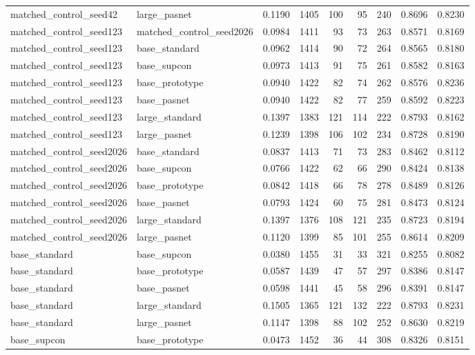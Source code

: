 \begin{tabular}{llrrrrrrr}
matched\_control\_seed42 & large\_pasnet & 0.1190 & 1405 & 100 & 95 & 240 & 0.8696 & 0.8230 \\
matched\_control\_seed123 & matched\_control\_seed2026 & 0.0984 & 1411 & 93 & 73 & 263 & 0.8571 & 0.8169 \\
matched\_control\_seed123 & base\_standard & 0.0962 & 1414 & 90 & 72 & 264 & 0.8565 & 0.8180 \\
matched\_control\_seed123 & base\_supcon & 0.0973 & 1413 & 91 & 75 & 261 & 0.8582 & 0.8163 \\
matched\_control\_seed123 & base\_prototype & 0.0940 & 1422 & 82 & 74 & 262 & 0.8576 & 0.8236 \\
matched\_control\_seed123 & base\_pasnet & 0.0940 & 1422 & 82 & 77 & 259 & 0.8592 & 0.8223 \\
matched\_control\_seed123 & large\_standard & 0.1397 & 1383 & 121 & 114 & 222 & 0.8793 & 0.8162 \\
matched\_control\_seed123 & large\_pasnet & 0.1239 & 1398 & 106 & 102 & 234 & 0.8728 & 0.8190 \\
matched\_control\_seed2026 & base\_standard & 0.0837 & 1413 & 71 & 73 & 283 & 0.8462 & 0.8112 \\
matched\_control\_seed2026 & base\_supcon & 0.0766 & 1422 & 62 & 66 & 290 & 0.8424 & 0.8138 \\
matched\_control\_seed2026 & base\_prototype & 0.0842 & 1418 & 66 & 78 & 278 & 0.8489 & 0.8126 \\
matched\_control\_seed2026 & base\_pasnet & 0.0793 & 1424 & 60 & 75 & 281 & 0.8473 & 0.8124 \\
matched\_control\_seed2026 & large\_standard & 0.1397 & 1376 & 108 & 121 & 235 & 0.8723 & 0.8194 \\
matched\_control\_seed2026 & large\_pasnet & 0.1120 & 1399 & 85 & 101 & 255 & 0.8614 & 0.8209 \\
base\_standard & base\_supcon & 0.0380 & 1455 & 31 & 33 & 321 & 0.8255 & 0.8082 \\
base\_standard & base\_prototype & 0.0587 & 1439 & 47 & 57 & 297 & 0.8386 & 0.8147 \\
base\_standard & base\_pasnet & 0.0598 & 1441 & 45 & 58 & 296 & 0.8391 & 0.8147 \\
base\_standard & large\_standard & 0.1505 & 1365 & 121 & 132 & 222 & 0.8793 & 0.8231 \\
base\_standard & large\_pasnet & 0.1147 & 1398 & 88 & 102 & 252 & 0.8630 & 0.8219 \\
base\_supcon & base\_prototype & 0.0473 & 1452 & 36 & 44 & 308 & 0.8326 & 0.8151 \\

\end{tabular}
